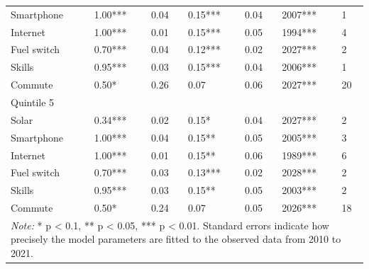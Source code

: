 \begin{tabular}{l{2cm}p{1cm}p{1cm}p{1cm}p{1cm}p{1cm}p{1cm}}
Smartphone & 1.00*** & 0.04 & 0.15*** & 0.04 & 2007*** & 1 \\
Internet & 1.00*** & 0.01 & 0.15*** & 0.05 & 1994*** & 4 \\
Fuel switch & 0.70*** & 0.04 & 0.12*** & 0.02 & 2027*** & 2 \\
Skills & 0.95*** & 0.03 & 0.15*** & 0.04 & 2006*** & 1 \\
Commute & 0.50* & 0.26 & 0.07 & 0.06 & 2027*** & 20 \\\midrule 
Quintile 5& & & & & & \\ \midrule
Solar & 0.34*** & 0.02 & 0.15* & 0.04 & 2027*** & 2 \\
Smartphone & 1.00*** & 0.04 & 0.15** & 0.05 & 2005*** & 3 \\
Internet & 1.00*** & 0.01 & 0.15** & 0.06 & 1989*** & 6 \\
Fuel switch & 0.70*** & 0.03 & 0.13*** & 0.02 & 2028*** & 2 \\
Skills & 0.95*** & 0.03 & 0.15** & 0.05 & 2003*** & 2 \\
Commute & 0.50* & 0.24 & 0.07 & 0.05 & 2026*** & 18 \\
          \bottomrule 
          \multicolumn{7}{p{10cm}}{\footnotesize \textit{Note:} * p < 0.1, ** p < 0.05, *** p < 0.01. Standard errors indicate how precisely the model parameters are fitted to the observed data from 2010 to 2021.}
          \end{tabular}